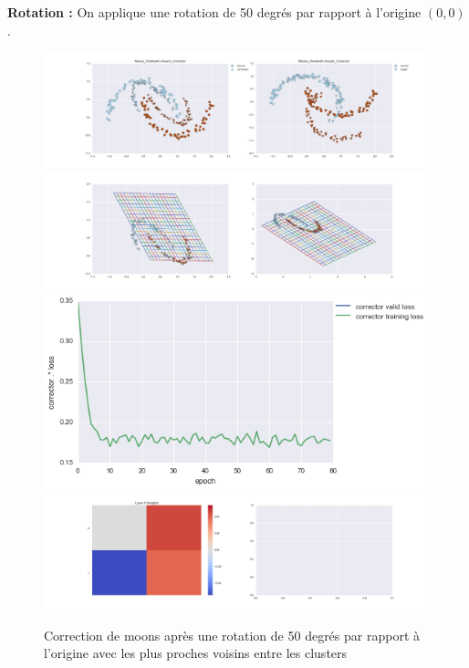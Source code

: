 
{\Large \textbf{Rotation :}} On applique une rotation de 50 degrés par rapport à l'origine $(0,0)$.

\begin{figure}[H] %
\centering
\includegraphics[width=\linewidth]{fig/24-05-2016/moons/Moons_RotatedK-closest_Corrector-DATA.png}
\includegraphics[width=\linewidth]{fig/24-05-2016/moons/Moons_RotatedK-closest_Corrector-GridCheck.png}
\includegraphics[width=0.45\linewidth]{fig/24-05-2016/moons/Moons_RotatedK-closest_Corrector-Learning_curve.png}
\includegraphics[width=\linewidth]{fig/24-05-2016/moons/Moons_RotatedK-closest_Corrector-W.png}
\caption{Correction de moons après une rotation de 50 degrés par rapport à l'origine avec les plus proches voisins entre les clusters}
\label{fig:recap-moons-rot-exhaustive}
\end{figure}

